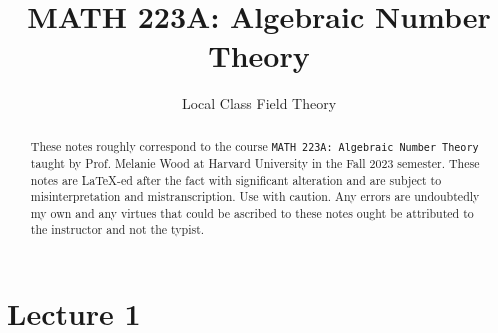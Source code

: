 \documentclass[]{scrarticle}
\title{MATH 223A: Algebraic Number Theory}
\subtitle{Local Class Field Theory}
\author{\spacedlowsmallcaps{Wern Juin Gabriel Ong}}
\date{}
\theoremstyle{definition}
\theoremstyle{remark}
\theoremstyle{example}
\begin{document}
\maketitle
\begin{abstract}
    These notes roughly correspond to the course \texttt{MATH 223A: Algebraic Number Theory} taught by Prof. Melanie Wood at Harvard University in the Fall 2023 semester. These notes are \LaTeX-ed after the fact with significant alteration and are subject to misinterpretation and mistranscription. Use with caution. Any errors are undoubtedly my own and any virtues that could be ascribed to these notes ought be attributed to the instructor and not the typist. 
\end{abstract}
\tableofcontents
\section{Lecture 1}
\end{document}
